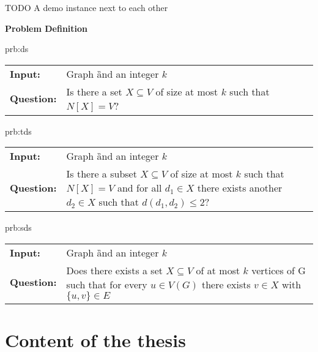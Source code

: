TODO A demo instance next to each other 

\textbf{Problem Definition}

\begin{prb}{prb:ds}

    \begin{tabularx}{0.9\textwidth}{>{\hsize=0.30\hsize}X>{\hsize=0.8\hsize}X}
        \textbf{Input:} & Graph \G and an integer $k$\\
        \textbf{Question:} & Is there a set $X \subseteq V$ of size at most $k$ such that $N[X] = V$? \\
    \end{tabularx}
        
\end{prb}

\begin{prb}{prb:tds}
    
    \begin{tabularx}{0.8\textwidth}{>{\hsize=0.35\hsize}X>{\hsize=0.8\hsize}X}
        \textbf{Input:} & Graph \G and an integer $k$\\
        \textbf{Question:} & Is there a subset $X \subseteq V$ of size at most $k$ such that $N[X] = V$ and for all $d_1 \in X$ there exists another $d_2 \in X$ such that $d(d_1, d_2) \leq 2$?\\
    \end{tabularx}
        
\end{prb}

\begin{prb}{prb:sds}
    
    \begin{tabularx}{0.8\textwidth}{>{\hsize=0.35\hsize}X>{\hsize=0.8\hsize}X}
        \textbf{Input:} & Graph \G and an integer $k$\\
        \textbf{Question:} & Does there exists a set $X \subseteq V$ of at most $k$ vertices of G such that for every $u \in V(G)$ there exists $v \in X$ with $\{u,v\} \in E$ \\
    \end{tabularx}
        
\end{prb}



\section{Content of the thesis}

